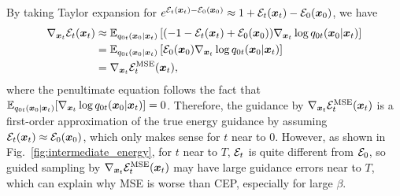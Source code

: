 By taking Taylor expansion for $e^{{\mathcal{E}}_t({\bm{x}}_t)-{\mathcal{E}}_0({\bm{x}}_0)}\approx 1 + {\mathcal{E}}_t({\bm{x}}_t)-{\mathcal{E}}_0({\bm{x}}_0)$, we have
\begin{equation*}
\begin{aligned}
    \nabla_{{\bm{x}}_t}{\mathcal{E}}_t({\bm{x}}_t) &\approx \mathbb{E}_{q_{0t}({\bm{x}}_0|{\bm{x}}_t)}\left[
        (-1 - {\mathcal{E}}_t({\bm{x}}_t) + {\mathcal{E}}_0({\bm{x}}_0))\nabla_{{\bm{x}}_t}\log q_{0t}({\bm{x}}_0|{\bm{x}}_t)
    \right] \\
    &= \mathbb{E}_{q_{0t}({\bm{x}}_0|{\bm{x}}_t)}\left[
        {\mathcal{E}}_0({\bm{x}}_0)\nabla_{{\bm{x}}_t}\log q_{0t}({\bm{x}}_0|{\bm{x}}_t)
    \right]\\
    &= \nabla_{{\bm{x}}_t}{\mathcal{E}}_t^{\text{MSE}}({\bm{x}}_t),
\end{aligned}
\end{equation*}
where the penultimate equation follows the fact that $\mathbb{E}_{q_{0t}({\bm{x}}_0|{\bm{x}}_t)}[\nabla_{{\bm{x}}_t}\log q_{0t}({\bm{x}}_0|{\bm{x}}_t)] = 0$. Therefore, the guidance by $\nabla_{{\bm{x}}_t}{\mathcal{E}}_t^\text{MSE}({\bm{x}}_t)$ is a first-order approximation of the true energy guidance by assuming ${\mathcal{E}}_t({\bm{x}}_t) \approx {\mathcal{E}}_0({\bm{x}}_0)$, which only makes sense for $t$ near to $0$. However, as shown in Fig.~\ref{fig:intermediate_energy}, for $t$ near to $T$, ${\mathcal{E}}_t$ is quite different from ${\mathcal{E}}_0$, so guided sampling by $\nabla_{{\bm{x}}_t}{\mathcal{E}}_t^{\text{MSE}}({\bm{x}}_t)$ may have large guidance errors near to $T$, which can explain why MSE is worse than CEP, especially for large $\beta$.


